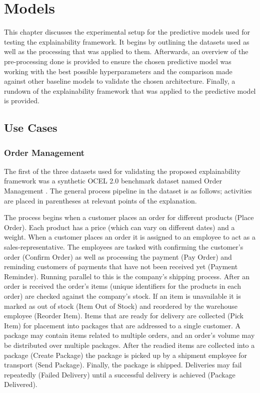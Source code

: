 
\chapter{Models}
\label{chp:models}

This chapter discusses the experimental setup for the predictive models used for testing the explainability framework. It begins by outlining the datasets used as well as the processing that was applied to them. Afterwards, an overview of the pre-processing done is provided to ensure the chosen predictive model was working with the best possible hyperparameters and the comparison made against other baseline models to validate the chosen architecture. Finally, a rundown of the explainability framework that was applied to the predictive model is provided.

\section{Use Cases}
    \subsection{Order Management}
        \label{sec:dataset_order_management}
    		The first of the three datasets used for validating the proposed explainability framework was a synthetic OCEL 2.0 benchmark dataset named Order Management \cite{knopp2023a}. The general process pipeline in the dataset is as follows; activities are placed in parentheses at relevant points of the explanation.
    
    		The process begins when a customer places an order for different products (Place Order). Each product has a price (which can vary on different dates) and a weight. When a customer places an order it is assigned to an employee to act as a sales-representative. The employees are tasked with confirming the customer's order (Confirm Order) as well as processing the payment (Pay Order) and reminding customers of payments that have not been received yet (Payment Reminder). 
    		Running parallel to this is the company's shipping process. After an order is received the order's items (unique identifiers for the products in each order) are checked against the company's stock. If an item is unavailable it is marked as out of stock (Item Out of Stock) and reordered by the warehouse employee (Reorder Item). Items that are ready for delivery are collected (Pick Item) for placement into packages that are addressed to a single customer. A package may contain items related to multiple orders, and an order's volume may be distributed over multiple packages.
    		After the readied items are collected into a package (Create Package) the package is picked up by a shipment employee for transport (Send Package).
    		Finally, the package is shipped. Deliveries may fail repeatedly (Failed Delivery) until a successful delivery is achieved (Package Delivered).
    
